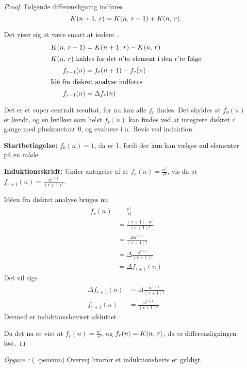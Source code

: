 \documentclass{article}
\newcounter{opgavecnt}
\newcommand{\opg}[1]{\stepcounter{opgavecnt}\textit{Opgave \arabic{opgavecnt}: }#1}
\begin{document}
\begin{proof}
Følgende differensligning indføres
\[
	\nobreak{K(n+1,\,r)} = \nobreak{K(n,\,r-1)} + \nobreak{K(n,\,r)}.
\] 

Det viser sig at være smart at isolere .
\begin{align*}
	\nobreak{K(n,\,r-1)} &= \nobreak{K(n+1,\,r)} - \nobreak{K(n,\,r)}\\
	\intertext{\ensuremath{\nobreak{K(n,\,r)}} kaldes for det $n$'te element i den $r$'te følge}
	f_{r-1}(n) &= f_{r}(n+1) - f_{r}(n)\\
	\intertext{Idé fra diskret analyse indføres}
	f_{r-1}(n) &= \Delta f_{r}(n)
\end{align*}

Det er et super centralt resultat, for nu kan alle $f_{r}$ findes. Det skyldes
at $f_0(n)$ er kendt, og en hvilken som helst $f_r(n)$ kan findes ved at
integrere diskret $r$ gange med pluskonstant 0, og evaluere i $n$. Bevis ved
induktion.

\smallskip

\textbf{Startbetingelse:} $f_0(n) = 1$, da  er 1, fordi der kun kan
vælges nul elementer på en måde.

\textbf{Induktionsskridt:} Under antagelse af at $f_r(n) =
\frac{n^{\overline{r}}}{r!}$, vis da at $f_{r+1}(n)
=\frac{n^{\overline{r+1}}}{(r+1)!}$.

Idéen fra diskret analyse bruges nu
\begin{align*}
	f_{r}(n) 
	   &= \frac{n^{\overline{r}}}{r!}\\
	   &= \frac{(r+1) \cdot n^{\overline{r}}}{(r+1)!}\\
	   &= \frac{\Delta n^{\overline{r+1}}}{(r+1)!}\\
	   &= \Delta\frac{n^{\overline{r+1}}}{(r+1)!}\\
	   &= \Delta f_{r+1}(n)
\end{align*}
Det vil sige
\begin{align*}
	\Delta f_{r+1}(n) &= \Delta\frac{n^{\overline{r+1}}}{(r+1)!}\\
	f_{r+1}(n) &= \frac{n^{\overline{r+1}}}{(r+1)!}
\end{align*}
Dermed er induktionsbeviset afsluttet.

\smallskip

Da det nu er vist at $f_r(n) = \frac{n^{\overline{r}}}{r!}$, og $f_r(n) =
\nobreak{K(n,\,r)}$, da er differensligningen løst.
\end{proof}

\opg{($\neg$pensum) Overvej hvorfor et induktionsbevis er gyldigt.}
\end{document}
